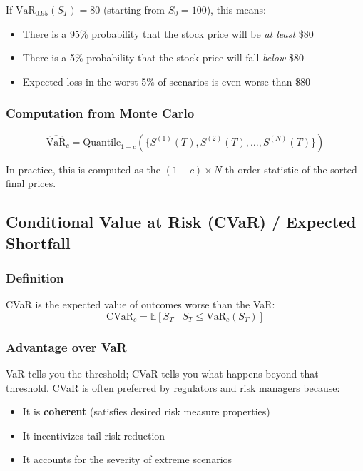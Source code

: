 \documentclass[12pt,a4paper]{article}
\begin{document}
If $\text{VaR}_{0.95}(S_T) = 80$ (starting from $S_0 = 100$), this means:
\begin{itemize}
    \item There is a 95\% probability that the stock price will be \textit{at least} \$80
    \item There is a 5\% probability that the stock price will fall \textit{below} \$80
    \item Expected loss in the worst 5\% of scenarios is even worse than \$80
\end{itemize}

\subsubsection{Computation from Monte Carlo}

\begin{equation}
\widehat{\text{VaR}}_c = \text{Quantile}_{1-c}\left(\{S^{(1)}(T), S^{(2)}(T), \ldots, S^{(N)}(T)\}\right)
\end{equation}

In practice, this is computed as the $(1-c) \times N$-th order statistic of the sorted final prices.

\subsection{Conditional Value at Risk (CVaR) / Expected Shortfall}

\subsubsection{Definition}

CVaR is the expected value of outcomes worse than the VaR:
\begin{equation}
\text{CVaR}_c = \mathbb{E}[S_T \mid S_T \leq \text{VaR}_c(S_T)]
\end{equation}

\subsubsection{Advantage over VaR}

VaR tells you the threshold; CVaR tells you what happens beyond that threshold. CVaR is often preferred by regulators and risk managers because:
\begin{itemize}
    \item It is \textbf{coherent} (satisfies desired risk measure properties)
    \item It incentivizes tail risk reduction
    \item It accounts for the severity of extreme scenarios
\end{itemize}
\end{document}
